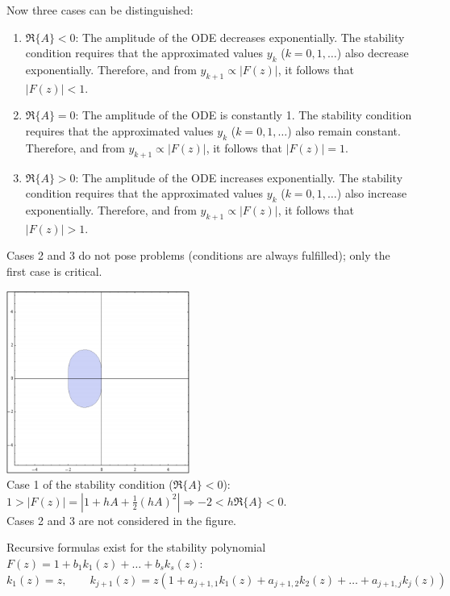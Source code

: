   \begin{minipage}{10cm}
      Now three cases can be distinguished:
      \begin{enumerate}
          \item $\Re\{A\} < 0$: The amplitude of the ODE decreases exponentially. The stability condition requires that the approximated values $y_k$ ($k=0,1,\ldots$) also decrease exponentially. Therefore, and from $y_{k+1} \propto | F(z) |$, it follows that $|F(z)| < 1$.
          \item $\Re\{A\} = 0$: The amplitude of the ODE is constantly 1. The stability condition requires that the approximated values $y_k$ ($k=0,1,\ldots$) also remain constant. Therefore, and from $y_{k+1} \propto | F(z) |$, it follows that $|F(z)| = 1$.
          \item $\Re\{A\} > 0$: The amplitude of the ODE increases exponentially. The stability condition requires that the approximated values $y_k$ ($k=0,1,\ldots$) also increase exponentially. Therefore, and from $y_{k+1} \propto | F(z) |$, it follows that $|F(z)| > 1$.
      \end{enumerate}

      Cases 2 and 3 do not pose problems (conditions are always fulfilled); only the first case is critical.
  \end{minipage}
  \hspace{1cm}
  \begin{minipage}{8cm}
      \includegraphics[width=6cm]{./bilder/ode_stability_heun.png}\\
      Case 1 of the stability condition ($\Re\{A\} < 0$): \\
      $1 > |F(z)| = |1 + hA + \frac12 (hA)^2| \Rightarrow -2 < h \Re\{A\} < 0$.\\
      Cases 2 and 3 are not considered in the figure.
  \end{minipage}

  \vspace{1em}
   
      Recursive formulas exist for the stability polynomial $F(z) = 1 + b_1 k_1(z) + \ldots + b_sk_s(z)$:\\
      $k_1(z) = z, \qquad k_{j+1}(z) = z(1 + a_{j+1,1} k_1(z) + a_{j+1,2} k_2(z) + \ldots + a_{j+1,j} k_j(z))$

